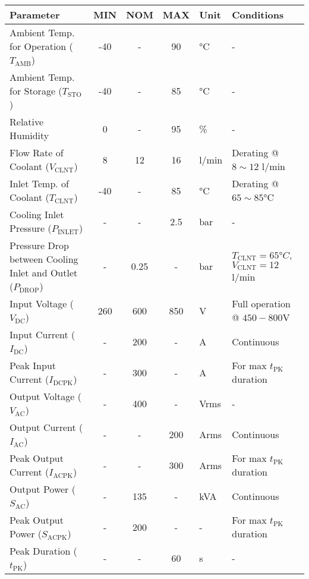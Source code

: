 \begin{table}[H]
    \centering
    \begin{adjustbox}{width=\textwidth,center}
    \begin{tabular}{|l|c|c|c|l|l|}
        \hline
        \textbf{Parameter} & \textbf{MIN} & \textbf{NOM} & \textbf{MAX} & \textbf{Unit} & \textbf{Conditions} \\
        \hline
        Ambient Temp. for Operation ($T_{\text{AMB}}$) & -40 & - & 90 & °C & - \\
        \hline
        Ambient Temp. for Storage ($T_{\text{STO}}$) & -40 & - & 85 & °C & - \\
        \hline
        Relative Humidity & 0 & - & 95 & \% & - \\
        \hline
        Flow Rate of Coolant ($V_{\text{CLNT}}$) & 8 & 12 & 16 & l/min & Derating @ $8\sim12$ l/min \\
        \hline
        Inlet Temp. of Coolant ($T_{\text{CLNT}}$) & -40 & - & 85 & °C & Derating @ $65\sim85$°C \\
        \hline
        Cooling Inlet Pressure ($P_{\text{INLET}}$) & - & - & 2.5 & bar & - \\
        \hline
        Pressure Drop between Cooling Inlet and Outlet ($P_{\text{DROP}}$) & - & 0.25 & - & bar & $T_{\text{CLNT}}=65°C$, $V_{\text{CLNT}}=12$ l/min \\
        \hline
        Input Voltage ($V_{\text{DC}}$) & 260 & 600 & 850 & V & Full operation @ $450-800$V \\
        \hline
        Input Current ($I_{\text{DC}}$) & - & 200 & - & A & Continuous \\
        \hline
        Peak Input Current ($I_{\text{DCPK}}$) & - & 300 & - & A & For max $t_{\text{PK}}$ duration \\
        \hline
        Output Voltage ($V_{\text{AC}}$) & - & 400 & - & Vrms & - \\
        \hline
        Output Current ($I_{\text{AC}}$) & - & - & 200 & Arms & Continuous \\
        \hline
        Peak Output Current ($I_{\text{ACPK}}$) & - & - & 300 & Arms & For max $t_{\text{PK}}$ duration \\
        \hline
        Output Power ($S_{\text{AC}}$) & - & 135 & - & kVA & Continuous \\
        \hline
        Peak Output Power ($S_{\text{ACPK}}$) & - & 200 & - & - & For max $t_{\text{PK}}$ duration \\
        \hline
        Peak Duration ($t_{\text{PK}}$) & - & - & 60 & s & - \\

\end{tabular}
\end{adjustbox}
\end{table}
